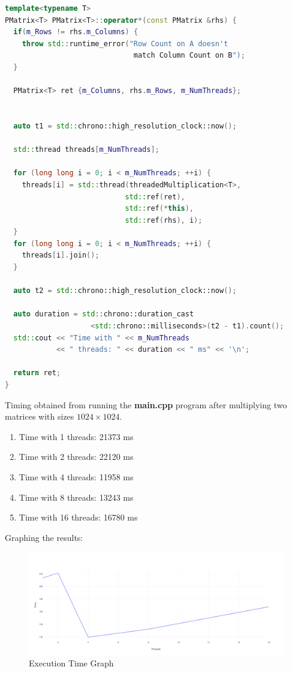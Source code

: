 \documentclass{article}
\begin{document}
\begin{lstlisting}[language=C++, caption={C++ Threaded Multiplication Function}]
template<typename T>
PMatrix<T> PMatrix<T>::operator*(const PMatrix &rhs) {
  if(m_Rows != rhs.m_Columns) {
	throw std::runtime_error("Row Count on A doesn't 
							  match Column Count on B");
  }

  PMatrix<T> ret {m_Columns, rhs.m_Rows, m_NumThreads};


  auto t1 = std::chrono::high_resolution_clock::now();

  std::thread threads[m_NumThreads];

  for (long long i = 0; i < m_NumThreads; ++i) {
	threads[i] = std::thread(threadedMultiplication<T>, 
							std::ref(ret), 
							std::ref(*this), 
							std::ref(rhs), i);
  }
  for (long long i = 0; i < m_NumThreads; ++i) {
	threads[i].join();
  }

  auto t2 = std::chrono::high_resolution_clock::now();

  auto duration = std::chrono::duration_cast
					<std::chrono::milliseconds>(t2 - t1).count();
  std::cout << "Time with " << m_NumThreads 
			<< " threads: " << duration << " ms" << '\n';

  return ret;
}
\end{lstlisting}

\pagebreak

Timing obtained from running the \textbf{main.cpp} program after multiplying two matrices with sizes $1024 \times 1024$.

\begin{enumerate}
\item Time with 1  threads:  21373 ms
\item Time with 2  threads:  22120 ms
\item Time with 4  threads:  11958 ms
\item Time with 8  threads:  13243 ms
\item Time with 16 threads:  16780 ms
\end{enumerate}

Graphing the results:
\begin{figure}[ht]
	\centering
	\includegraphics[scale=0.2]{graphic.png}
	\caption{Execution Time Graph}
\end{figure}
\end{document}

